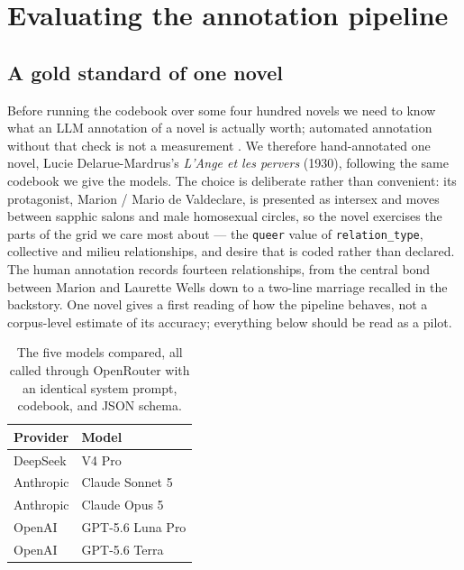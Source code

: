 %
%

\section{Evaluating the annotation pipeline}
\label{sec:evaluation}

\subsection{A gold standard of one novel}

Before running the codebook over some four hundred novels we need to know what
an LLM annotation of a novel is actually worth; automated annotation without
that check is not a measurement \cite{pangakis2023validation}. We therefore
hand-annotated one novel, Lucie Delarue-Mardrus's \emph{L'Ange et les pervers}
(1930), following the same codebook we give the models. The choice is
deliberate rather than convenient: its protagonist, Marion / Mario de
Valdeclare, is presented as intersex and moves between sapphic salons and male
homosexual circles, so the novel exercises the parts of the grid we care most
about --- the \texttt{queer} value of \texttt{relation\_type}, collective and
milieu relationships, and desire that is coded rather than declared. The human
annotation records fourteen relationships, from the central bond between Marion
and Laurette Wells down to a two-line marriage recalled in the backstory. One
novel gives a first reading of how the pipeline behaves, not a corpus-level
estimate of its accuracy; everything below should be read as a pilot.

\begin{table}[h]
  \centering
  \small
  \begin{tabular}{ll}
    \toprule
    Provider & Model \\
    \midrule
    DeepSeek  & V4 Pro \\
    Anthropic & Claude Sonnet 5 \\
    Anthropic & Claude Opus 5 \\
    OpenAI    & GPT-5.6 Luna Pro \\
    OpenAI    & GPT-5.6 Terra \\
    \bottomrule
  \end{tabular}
  \caption{The five models compared, all called through OpenRouter with an
  identical system prompt, codebook, and JSON schema.}
  \label{tab:models}
\end{table}

